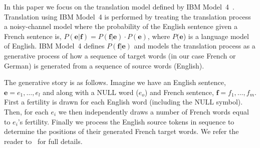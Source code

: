 In this paper we focus on the translation model defined by IBM
Model~4~\citep{model4}.  Translation using IBM Model~4 is performed by
treating the translation process a noisy-channel model where the
probability of the English sentence given a French sentence is,
$P(\mathbf{e}|\mathbf{f}) = P(\mathbf{f}|\mathbf{e}) \cdot
P(\mathbf{e})$, where $P(\mathbf{e}$) is a language model of English.
IBM Model~4 defines $P(\mathbf{f}|\mathbf{e})$ and models the
translation process as a generative process of how a sequence of
target words (in our case French or German) is generated from a
sequence of source words (English).

The generative story is as follows.  Imagine we have an English
sentence, $\mathbf{e} = e_1, \dots,e_l$ and along with a NULL word
($e_o$) and French sentence, $\mathbf{f} = f_1, \dots, f_m$.  First a
fertility is drawn for each English word (including the NULL symbol).
Then, for each $e_i$ we then independently draws a number of French
words equal to $e_i$'s fertility.  Finally we process the English
source tokens in sequence to determine the positions of their
generated French target words.  We refer the reader to~\cite{model4}
for full details.



